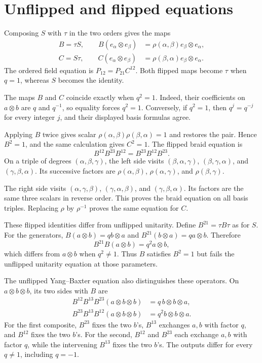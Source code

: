 \section{Unflipped and flipped equations}
\label{sec:vertex-flipped-operators}

Composing $S$ with $\tau$ in the two orders gives the maps
\[
 \begin{aligned}
 B=\tau S,\qquad
 B(e_\alpha\otimes e_\beta)
   &=\rho(\alpha,\beta)e_\beta\otimes e_\alpha,\\
 C=S\tau,\qquad
 C(e_\alpha\otimes e_\beta)
   &=\rho(\beta,\alpha)e_\beta\otimes e_\alpha.
 \end{aligned}
\]
The ordered field equation is $P_{12}=P_{21}C^{12}$.
Both flipped maps become $\tau$ when $q=1$, whereas $S$ becomes
the identity.

The maps $B$ and $C$ coincide exactly when $q^2=1$.
Indeed, their coefficients on $a\otimes b$ are $q$ and $q^{-1}$,
so equality forces $q^2=1$.
Conversely, if $q^2=1$, then $q^j=q^{-j}$ for every integer $j$,
and their displayed basis formulas agree.

Applying $B$ twice gives scalar
$\rho(\alpha,\beta)\rho(\beta,\alpha)=1$ and restores the pair.
Hence $B^2=1$, and the same calculation gives $C^2=1$.
The flipped braid equation is
\[
 B^{12}B^{23}B^{12}=B^{23}B^{12}B^{23}.
\]
On a triple of degrees $(\alpha,\beta,\gamma)$, the left side
visits $(\beta,\alpha,\gamma)$, $(\beta,\gamma,\alpha)$,
and $(\gamma,\beta,\alpha)$.
Its successive factors are $\rho(\alpha,\beta)$,
$\rho(\alpha,\gamma)$, and $\rho(\beta,\gamma)$.

The right side visits $(\alpha,\gamma,\beta)$,
$(\gamma,\alpha,\beta)$, and $(\gamma,\beta,\alpha)$.
Its factors are the same three scalars in reverse order.
This proves the braid equation on all basis triples.
Replacing $\rho$ by $\rho^{-1}$ proves the same equation for $C$.

These flipped identities differ from unflipped unitarity.
Define $B^{21}=\tau B\tau$ as for $S$.
For the generators, $B(a\otimes b)=q b\otimes a$ and
$B^{21}(b\otimes a)=q a\otimes b$.
Therefore
\[
 B^{21}B(a\otimes b)=q^2a\otimes b,
\]
which differs from $a\otimes b$ when $q^2\ne1$.
Thus $B$ satisfies $B^2=1$ but fails the unflipped unitarity
equation at those parameters.

The unflipped Yang--Baxter equation also distinguishes these operators.
On $a\otimes b\otimes b$, its two sides with $B$ are
\[
 \begin{aligned}
 B^{12}B^{13}B^{23}(a\otimes b\otimes b)
   &=q\,b\otimes b\otimes a,\\
 B^{23}B^{13}B^{12}(a\otimes b\otimes b)
   &=q^2b\otimes b\otimes a.
 \end{aligned}
\]
For the first composite, $B^{23}$ fixes the two $b$'s,
$B^{13}$ exchanges $a,b$ with factor $q$, and $B^{12}$ fixes the two $b$'s.
For the second, $B^{12}$ and $B^{23}$ each exchange $a,b$
with factor $q$, while the intervening $B^{13}$ fixes the two $b$'s.
The outputs differ for every $q\ne1$, including $q=-1$.

